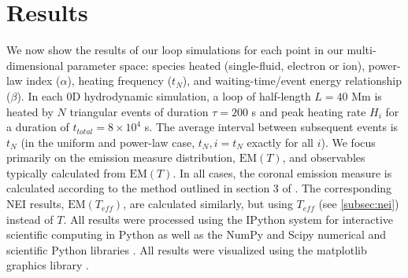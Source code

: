 \documentclass[apj]{emulateapj}
\begin{document}
	\section{Results}
	\label{sec:results}
	\par We now show the results of our loop simulations for each point in our multi-dimensional parameter space: species heated (single-fluid, electron or ion), power-law index ($\alpha$), heating frequency ($t_N$), and waiting-time/event energy relationship ($\beta$). In each 0D hydrodynamic simulation, a loop of half-length $L=40$ Mm is heated by $N$ triangular events of duration $\tau=200$ s and peak heating rate $H_i$ for a duration of $t_{total}=8\times10^4$ s. The average interval between subsequent events is $t_N$ (in the uniform and power-law case, $t_N,i=t_N$ exactly for all $i$). We focus primarily on the emission measure distribution, $\mathrm{EM}(T)$, and observables typically calculated from $\mathrm{EM}(T)$. In all cases, the coronal emission measure is calculated according to the method outlined in section 3 of . The corresponding NEI results, $\mathrm{EM}(T_{eff})$, are calculated similarly, but using $T_{eff}$ (see \autoref{subsec:nei}) instead of $T$. All results were processed using the IPython system for interactive scientific computing in Python \citep{perez_ipython:_2007} as well as the NumPy and Scipy numerical and scientific Python libraries \citep{van_der_walt_numpy_2011}. All results were visualized using the matplotlib graphics library \citep{hunter_matplotlib:_2007}.
\end{document}
